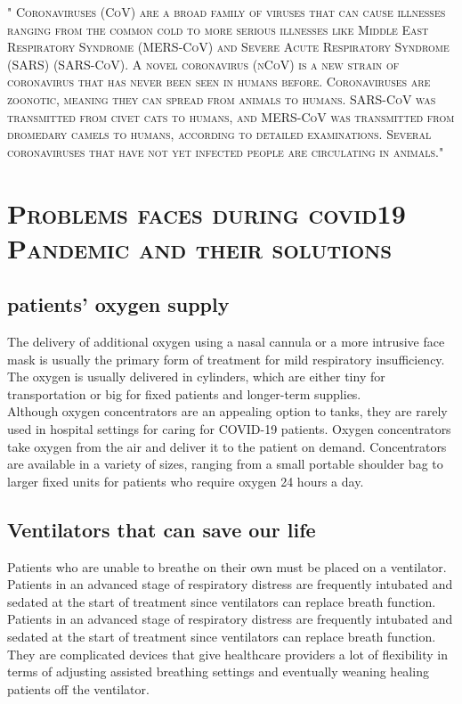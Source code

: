 \documentclass[12pt]{article}
\begin{document}
\begin{flushleft}

\begin{tiny}
\textsc{  " Coronaviruses (CoV) are a broad family of viruses that can cause illnesses ranging from the common cold to more serious illnesses like Middle East Respiratory Syndrome (MERS-CoV) and Severe Acute Respiratory Syndrome (SARS) (SARS-CoV). A novel coronavirus (nCoV) is a new strain of coronavirus that has never been seen in humans before. Coronaviruses are zoonotic, meaning they can spread from animals to humans. SARS-CoV was transmitted from civet cats to humans, and MERS-CoV was transmitted from dromedary camels to humans, according to detailed examinations. Several coronaviruses that have not yet infected people are circulating in animals."}

\end{tiny}










\section{
\textsc{\large Problems faces during  covid19 Pandemic   and their solutions} }
\subsection{patients' oxygen supply}
The delivery of additional oxygen using a nasal cannula or a more intrusive face mask is usually the primary form of treatment for mild respiratory insufficiency. The oxygen is usually delivered in cylinders, which are either tiny for transportation or big for fixed patients and longer-term supplies.\\
[1cm]
Although oxygen concentrators are an appealing option to tanks, they are rarely used in hospital settings for caring for COVID-19 patients. Oxygen concentrators take oxygen from the air and deliver it to the patient on demand. Concentrators are available in a variety of sizes, ranging from a small portable shoulder bag to larger fixed units for patients who require oxygen 24 hours a day. \\
[0.75cm]
\subsection{Ventilators that can save our  life}
Patients who are unable to breathe on their own must be placed on a ventilator. Patients in an advanced stage of respiratory distress are frequently intubated and sedated at the start of treatment since ventilators can replace breath function.\\
[0.9cm]
Patients in an advanced stage of respiratory distress are frequently intubated and sedated at the start of treatment since ventilators can replace breath function. They are complicated devices that give healthcare providers a lot of flexibility in terms of adjusting assisted breathing settings and eventually weaning healing patients off the ventilator. \\

\end{flushleft}
\end{document}
